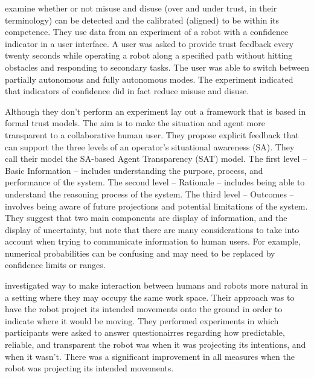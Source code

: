 \citet{Kaniarasu2013-ho} examine whether or not misuse and disuse (over and under trust, in their terminology) can be detected and the calibrated (aligned) to be within its competence. They use data from an experiment of a robot with a confidence indicator in a user interface. A user was asked to provide trust feedback every twenty seconds while operating a robot along a specified path without hitting obstacles and responding to secondary tasks. The user was able to switch between partially autonomous and fully autonomous modes. The experiment indicated that indicators of confidence did in fact reduce misuse and disuse. 

Although they don't perform an experiment \citet{Chen2014-dk} lay out a framework that is based in formal trust models. The aim is to make the situation and agent more transparent to a collaborative human user. They propose explicit feedback that can support the three levels of an operator's situational awareness (SA). They call their model the SA-based Agent Transparency (SAT) model. The first level -- Basic Information -- includes understanding the purpose, process, and performance of the system. The second level -- Rationale -- includes being able to understand the reasoning process of the system. The third level -- Outcomes -- involves being aware of future projections and potential limitations of the system. They suggest that two main components are display of information, and the display of uncertainty, but note that there are many considerations to take into account when trying to communicate information to human users. For example, numerical probabilities can be confusing and may need to be replaced by confidence limits or ranges. 

\citet{Chadalavada2015-wx} investigated way to make interaction between humans and robots more natural in a setting where they may occupy the same work space. Their approach was to have the robot project its intended movements onto the ground in order to indicate where it would be moving. They performed experiments in which participants were asked to answer questionairres regarding how predictable, reliable, and transparent the robot was when it was projecting its intentions, and when it wasn't. There was a significant improvement in all measures when the robot was projecting its intended movements. 

